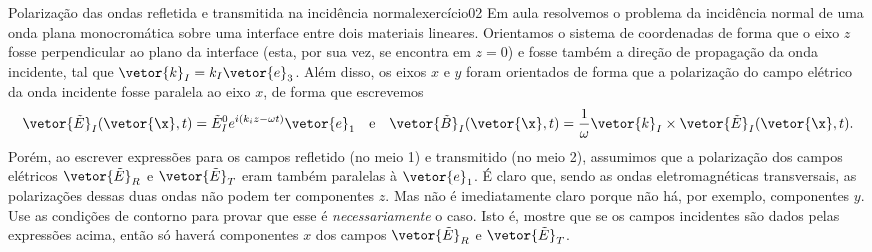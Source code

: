 \begin{exercício}{Polarização das ondas refletida e transmitida na incidência normal}{exercício02}
    Em aula resolvemos o problema da incidência normal de uma onda plana monocromática sobre uma interface entre dois materiais lineares. Orientamos o sistema de coordenadas de forma que o eixo \(z\) fosse perpendicular ao plano da interface (esta, por sua vez, se encontra em \(z = 0\)) e fosse também a direção de propagação da onda incidente, tal que \(\vetor{k}_I = k_I \vetor{e}_3\). Além disso, os eixos \(x\) e \(y\) foram orientados de forma que a polarização do campo elétrico da onda incidente fosse paralela ao eixo \(x\), de forma que escrevemos
    \begin{equation*}
        \vetor{\tilde{E}}_I(\vetor{\x},t) = \tilde{E}^0_I e^{i(k_i z - \omega t)}\vetor{e}_1\quad\text{e}\quad
        \vetor{\tilde{B}}_I(\vetor{\x}, t) = \frac{1}{\omega} \vetor{k}_I \times \vetor{\tilde{E}}_I(\vetor{\x},t).
    \end{equation*}
    Porém, ao escrever expressões para os campos refletido (no meio 1) e transmitido (no meio 2), assumimos que a polarização dos campos elétricos \(\vetor{\tilde{E}}_R\) e \(\vetor{\tilde{E}}_T\) eram também paralelas à \(\vetor{e}_1\). É claro que, sendo as ondas eletromagnéticas transversais, as polarizações dessas duas ondas não podem ter componentes \(z\). Mas não é imediatamente claro porque não há, por exemplo, componentes \(y\). Use as condições de contorno para provar que esse é \emph{necessariamente} o caso. Isto é, mostre que se os campos incidentes são dados pelas expressões acima, então só haverá componentes \(x\) dos campos \(\vetor{\tilde{E}}_R\) e \(\vetor{\tilde{E}}_T\).
\end{exercício}
